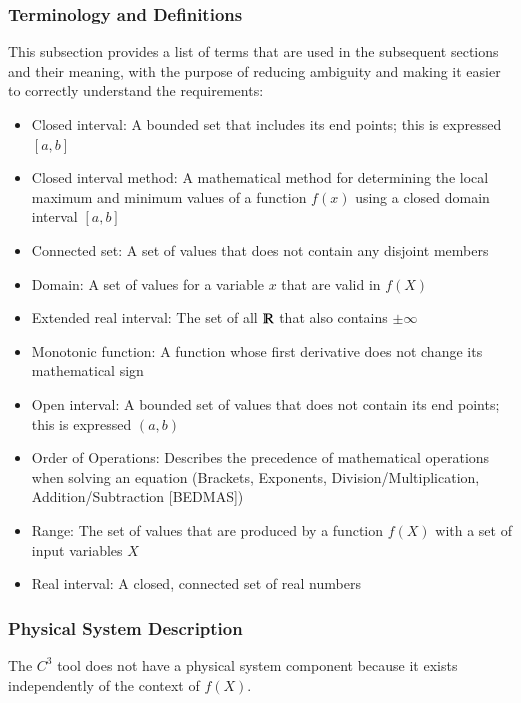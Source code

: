 \documentclass[12pt]{article}
\newcommand{\prognameAbbrv}{$C^{3}$}
\begin{document}
\subsubsection{Terminology and  Definitions}

This subsection provides a list of terms that are used in the subsequent
sections and their meaning, with the purpose of reducing ambiguity and making it
easier to correctly understand the requirements:

\begin{itemize}

\item Closed interval: A bounded set that includes its end points; this is 
expressed $[a,b]$
\item Closed interval method: A mathematical method for determining the local 
maximum and minimum values of a function $f(x)$ using a closed domain interval 
$[a,b]$
\item Connected set: A set of values that does not contain any disjoint members
\item Domain: A set of values for a variable $x$ that are valid in $f(X)$
\item Extended real interval: The set of all $\varmathbb{R}$ that also contains 
$\pm \infty$
\item Monotonic function: A function whose first derivative does not change its 
mathematical sign
\item Open interval: A bounded set of values that does not contain its end 
points; this is expressed $(a,b)$
\item Order of Operations: Describes the precedence of mathematical operations 
when solving an equation (Brackets, Exponents, Division/Multiplication, 
Addition/Subtraction [BEDMAS])
\item Range: The set of values that are produced by a function $f(X)$ with a 
set of input variables $X$
\item Real interval: A closed, connected set of real numbers

\end{itemize}

\subsubsection{Physical System Description}

The \prognameAbbrv{} tool does not have a physical system component because it 
exists independently of the context of $f(X)$. 
\end{document}
